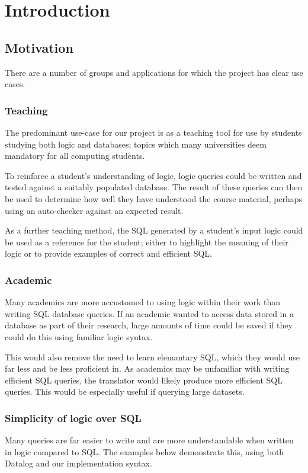 \documentclass[a4paper, 11pt]{article}
\begin{document}
\section{Introduction}
  \subsection{Motivation}
    There are a number of groups and applications for which the project has
    clear use cases.

    \subsubsection{Teaching}
      The predominant use-case for our project is as a teaching tool for use by
      students studying both logic and databases; topics which many universities
      deem mandatory for all computing students.

      To reinforce a student's understanding of logic, logic queries could be
      written and tested against a suitably populated database. The result of
      these queries can then be used to determine how well they have understood
      the course material, perhaps using an auto-checker against an expected
      result.

      As a further teaching method, the SQL generated by a student's input logic
      could be used as a reference for the student; either to highlight the
      meaning of their logic or to provide examples of correct and efficient
      SQL.

    \subsubsection{Academic}
      Many academics are more accustomed to using logic within their work than
      writing SQL database queries. If an academic wanted to access data stored
      in a database as part of their research, large amounts of time could be
      saved if they could do this using familiar logic syntax.

      This would also remove the need to learn elemantary SQL, which they would
      use far less and be less proficient in. As academics may be unfamiliar
      with writing efficient SQL queries, the translator would likely produce
      more efficient SQL queries. This would be especially useful if querying
      large datasets.

    \subsubsection{Simplicity of logic over SQL}
      Many queries are far easier to write and are more understandable when
      written in logic compared to SQL. The examples below demonstrate this,
      using both Datalog and our implementation syntax.
\end{document}
